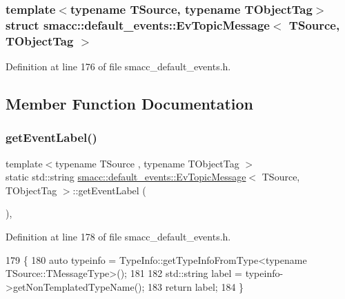 \subsubsection*{template$<$typename T\+Source, typename T\+Object\+Tag$>$\newline
struct smacc\+::default\+\_\+events\+::\+Ev\+Topic\+Message$<$ T\+Source, T\+Object\+Tag $>$}



Definition at line 176 of file smacc\+\_\+default\+\_\+events.\+h.



\subsection{Member Function Documentation}
\mbox{\label{structsmacc_1_1default__events_1_1EvTopicMessage_afaa5fc76f1c6c3eaf30deb8aa58508c0}} 
\subsubsection{\texorpdfstring{get\+Event\+Label()}{getEventLabel()}}
{\footnotesize\ttfamily template$<$typename T\+Source , typename T\+Object\+Tag $>$ \\
static std\+::string \hyperlink{structsmacc_1_1default__events_1_1EvTopicMessage}{smacc\+::default\+\_\+events\+::\+Ev\+Topic\+Message}$<$ T\+Source, T\+Object\+Tag $>$\+::get\+Event\+Label (\begin{DoxyParamCaption}{ }\end{DoxyParamCaption})\hspace{0.3cm}{\ttfamily [inline]}, {\ttfamily [static]}}



Definition at line 178 of file smacc\+\_\+default\+\_\+events.\+h.


\begin{DoxyCode}
179   \{
180     \textcolor{keyword}{auto} typeinfo = TypeInfo::getTypeInfoFromType<typename TSource::TMessageType>();
181 
182     std::string label = typeinfo->getNonTemplatedTypeName();
183     \textcolor{keywordflow}{return} label;
184   \}
\end{DoxyCode}


